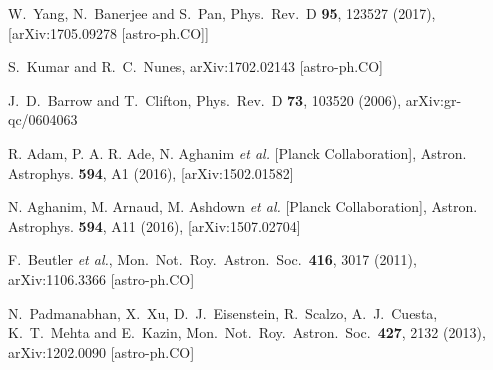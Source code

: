 \documentclass[superscriptaddress,oneolumn,secnumarabic,
amssymb,amsmath,nobibnotes,aps,prd,showpacs,nofootinbib]{revtex4}%
\begin{document}
\begin{thebibliography}{*}
  W.~Yang, N.~Banerjee and S.~Pan,
  Phys.\ Rev.\ D {\bf 95}, 123527 (2017),
  [arXiv:1705.09278 [astro-ph.CO]]


  S.~Kumar and R.~C.~Nunes,
  arXiv:1702.02143 [astro-ph.CO]


 J.~D.~Barrow and T.~Clifton, Phys.\ Rev.\ D \textbf{%
73}, 103520 (2006), arXiv:gr-qc/0604063






 R. Adam, P. A. R. Ade, N. Aghanim {\it et al.} [Planck Collaboration], Astron. Astrophys. \textbf{594}, A1 (2016), [arXiv:1502.01582]


 N. Aghanim, M. Arnaud, M. Ashdown {\it et al.} [Planck Collaboration], Astron. Astrophys. \textbf{594}, A11 (2016), [arXiv:1507.02704]


  F.~Beutler {\it et al.},
  Mon.\ Not.\ Roy.\ Astron.\ Soc.\  {\bf 416}, 3017 (2011),
  arXiv:1106.3366 [astro-ph.CO]


  N.~Padmanabhan, X.~Xu, D.~J.~Eisenstein, R.~Scalzo, A.~J.~Cuesta, K.~T.~Mehta and E.~Kazin,
  Mon.\ Not.\ Roy.\ Astron.\ Soc.\  {\bf 427}, 2132 (2013),
  arXiv:1202.0090 [astro-ph.CO]



\end{thebibliography}
\end{document}
